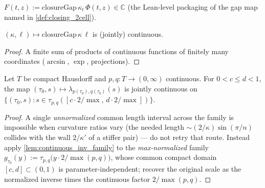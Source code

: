\begin{definition}

  \label{def:closing_gap}
  $F(t,z) := \mathrm{closureGap}\,\kappa_t\,\Phi(t,z) \in \mathbb{C}$ (the
  Lean-level packaging of the gap map named in \cref{def:closing_2cell}).
\end{definition}

\begin{lemma}

  \label{lem:continuous_closure_gap}
  $(\kappa, \ell) \mapsto \mathrm{closureGap}\,\kappa\,\ell$ is (jointly)
  continuous.
\end{lemma}
\begin{proof}

\leanok
  A finite sum of products of continuous functions of finitely many
  coordinates ($\arcsin$, $\exp$, projections).
\end{proof}

\begin{lemma}

  \label{lem:continuous_chart_inv_family}
  Let $T$ be compact Hausdorff and $p, q : T \to (0,\infty)$ continuous. For
  $0 < c \le d < 1$, the map $(\tau_0, s) \mapsto
  \lambda_{p(\tau_0),q(\tau_0)}(s)$ is jointly continuous on
  $\{(\tau_0,s) : s \in \tau_{p,q}([c \cdot 2/\max,\, d \cdot 2/\max])\}$.
\end{lemma}
\begin{proof}

\leanok
  A single \emph{unnormalized} common length interval across the family is
  impossible when curvature ratios vary (the needed length
  $\sim (2/\kappa)\sin(\pi/n)$ collides with the wall $2/\kappa'$ of a
  stiffer pair) --- do not retry that route. Instead apply
  \cref{lem:continuous_inv_family} to the \emph{max-normalized} family
  $g_{\tau_0}(y) := \tau_{p,q}\bigl(y \cdot 2/\max(p,q)\bigr)$, whose common
  compact domain $[c,d] \subset (0,1)$ is parameter-independent; recover the
  original scale as the normalized inverse times the continuous factor
  $2/\max(p,q)$.
\end{proof}

